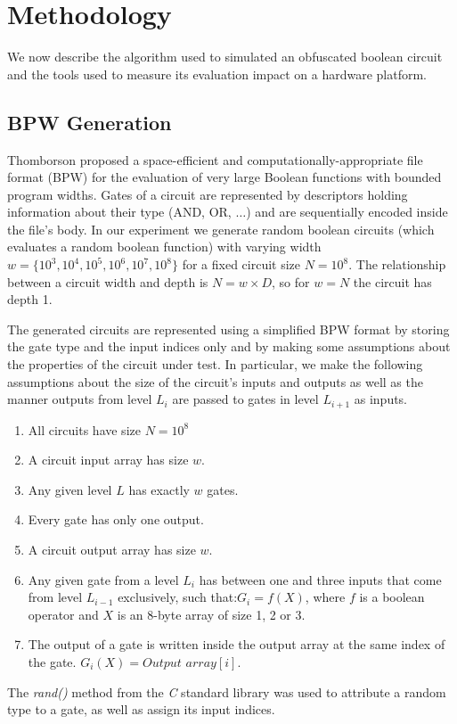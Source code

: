 \section{Methodology}
We now describe the algorithm used to simulated an obfuscated boolean circuit and the tools used to measure its evaluation impact on a hardware platform.

\subsection{BPW Generation} 
Thomborson proposed a space-efficient and computationally-appropriate file format (BPW) for the evaluation of very large Boolean functions with bounded program widths\cite{clark}. Gates of a circuit are represented by descriptors holding information about their type (AND, OR, $\dots$) and are sequentially encoded inside the file's body. In our experiment we generate random boolean circuits (which evaluates a random boolean function) with varying width $w = \{ 10^3, 10^4, 10^5, 10^6, 10^7, 10^8\}$ for a fixed circuit size $N = 10^8$. The relationship between a circuit width and depth is $ N = w \times D $, so for $ w = N$ the circuit has depth 1.
\par
The generated circuits are represented using a simplified BPW format by storing the gate type and the input indices only and by making some assumptions about the properties of the circuit under test. In particular, we make the following assumptions about the size of the circuit's inputs and outputs as well as the manner outputs from level $L_i$ are passed to gates in level $L_{i+1}$ as inputs.
\begin{enumerate}  
\item All circuits have size $N = 10^8$
\item A circuit input array has size $w$.
\item Any given level $L$ has exactly $w$ gates.
\item Every gate has only one output.
\item A circuit output array has size $w$.
\item Any given gate from a level $L_i$ has between one and three inputs that come from level $L_{i-1}$ exclusively, such that:\break $G_i = f(X)$, where $f$ is a boolean operator and $X$ is an 8-byte array of size 1, 2 or 3. 
\item The output of a gate is written inside the output array at the same index of the gate. $G_i(X) = Output$ $array[i]$.
\end{enumerate}
The \textit{rand()} method from the \textit{C} standard library was used to attribute a random type to a gate, as well as assign its input indices.

